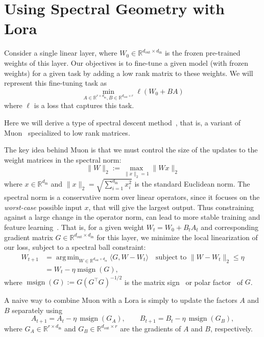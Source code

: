 \documentclass[11pt]{article}
\newcommand{\R}{\mathbb{R}}
\DeclareMathOperator*{\argmin}{arg\,min}
\DeclareMathOperator{\polar}{msign}          %
\theoremstyle{plain}
\theoremstyle{definition}
\theoremstyle{remark}
\begin{document}
\section{Using Spectral Geometry with Lora}
\label{sec:setup}


Consider a single linear layer, where $W_0 \in \R^{d_{\mathrm{out}} \times d_{\mathrm{in}}}$ is the frozen pre-trained weights of this layer. Our objectives is to fine-tune a given model (with frozen weights) for a given task by adding a low rank matrix to these weights. We will represent this fine-tuning task as
\begin{equation}
    \min_{A\in\R^{r\times d_{\mathrm{in}}},
B\in\R^{d_{\mathrm{out}}\times r}} \ell(W_0 + BA)
\end{equation}
where $\ell$ is a loss that captures this task.  

Here we will derive a type of spectral descent method~\cite{Volkanpaper1, Volkcanpaper2}, that is, a variant of Muon~\cite{muon} specialized to low rank matrices.

The key idea behind Muon is that we must control the size of the updates to the weight matrices in the spectral norm:
\[ \|W\|_2 := \max_{\|x\|_2 =1} \|W x \|_2\]
where $x\in \R^{d_{\mathrm{in}}}$ and $\|x\|_2 = \sqrt{\sum_{i=1}^{d_{\mathrm{in}}} x_i^2}$ is the standard Euclidean norm.
The spectral norm is a conservative norm over linear operators, since it focuses on the \emph{worst-case} possible input $x$, that will give the largest output. Thus constraining against a large change in the operator norm, can lead to more stable training and feature learning~\cite{Bernstein,Modular}.
That is, for a given weight $W_t = W_0 + B_tA_t$ and corresponding  gradient matrix $G \in \R^{d_{\mathrm{out}} \times d_{\mathrm{in}}}$ for this layer, we minimize the local linearization of our loss, subject to a spectral ball constraint:
\begin{align} \label{eq:muon}
    W_{t+1} &= \argmin_{W\in  \R^{d_{\mathrm{out}} \times d_{\mathrm{in}}}} \langle G,W-W_t\rangle \quad \mbox{subject to } \| W-W_t\|_2 \leq \eta \\
    &= W_t - \eta \polar(G),
\end{align} 
where $\polar(G):= G(G^\top G)^{-1/2}$ is the matrix sign~\cite{muon} or polar factor~\cite{polarexpress} of $G$.

A naive way to combine Muon with a Lora is simply to update the factors $A$ and $B$ separately using  
\begin{equation}
   A_{t+1} = A_t-\eta\,\polar(G_A),\qquad  B_{t+1}= B_t-\eta\,\polar(G_B),
  \label{eq:naive}
\end{equation}
where $G_A \in  \R^{r\times d_{\mathrm{in}}}$ and $G_B
\in\R^{d_{\mathrm{out}}\times r}$ are the gradients of $A$ and $B$, respectively. 
\end{document}
